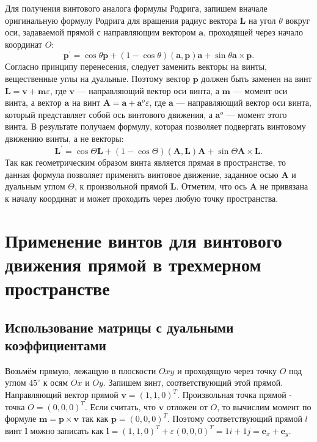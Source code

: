 \documentclass[%
]{ittmm}
\begin{document}
Для получения винтового аналога формулы Родрига, запишем вначале оригинальную формулу Родрига для вращения радиус вектора $\mathbf{L}$ на угол $\theta$ вокруг оси, задаваемой прямой с направляющим вектором $\mathbf{a}$, проходящей через начало координат $O$:
\begin{equation*}
  \mathbf{p}^\prime = \cos\theta \mathbf{p} + (1 - \cos\theta) (\mathbf{a}, \mathbf{p})\mathbf{a} + \sin\theta \mathbf{a}\times\mathbf{p}.
\end{equation*}
Согласно принципу перенесения, следует заменить векторы на винты, вещественные углы на дуальные. Поэтому вектор $\mathbf{p}$ должен быть заменен на винт $\mathbf{L} = \mathbf{v} + \mathbf{m} \varepsilon$, где $\mathbf{v}$ — направляющий вектор оси винта, а $\mathbf{m}$ — момент оси винта, а вектор $\mathbf{a}$ на винт $\mathbf{A} = \mathbf{a} + \mathbf{a}^o \varepsilon$, где $\mathbf{a}$ — направляющий вектор оси винта, который представляет собой ось винтового движения, а $\mathbf{a}^o$ — момент этого винта. В результате получаем формулу, которая позволяет подвергать винтовому движению винты, а не векторы:
\begin{equation*}
  \mathbf{L}^\prime = \cos\Theta \mathbf{L} + (1 - \cos\Theta) (\mathbf{A}, \mathbf{L})\mathbf{A} + \sin\Theta \mathbf{A}\times\mathbf{L}.
\end{equation*}
Так как геометрическим образом винта является прямая в пространстве, то данная формула позволяет применять винтовое движение, заданное осью $\mathbf{A}$ и дуальным углом $\Theta$, к произвольной прямой $\mathbf{L}$. Отметим, что ось $\mathbf{A}$ не привязана к началу координат и может проходить через любую точку пространства.

\section{Применение винтов для винтового движения прямой в трехмерном пространстве}

\subsection{Использование матрицы с дуальными коэффициентами}

Возьмём прямую, лежащую в плоскости $Oxy$ и проходящую через точку $O$ под углом $45^\circ$ к осям $Ox$ и $Oy$. Запишем винт, соответствующий этой прямой.
Направляющий вектор прямой $\mathbf{v}=(1,1,0)^T$. Произвольная точка прямой - точка $O=(0,0,0)^T$. Если считать, что $\mathbf{v}$ отложен от $O$, то вычислим
момент по формуле $\mathbf{m} = \mathbf{p} \times \mathbf{v}$ так как $\mathbf{p}=(0,0,0)^T$. Поэтому соответствующий прямой $l$ винт $\mathbf{l}$ можно записать как
$\mathbf{l} = (1,1,0)^T + \varepsilon (0,0,0)^T = 1 i + 1 j = \mathbf{e}_x + \mathbf{e}_y$.
\end{document}
